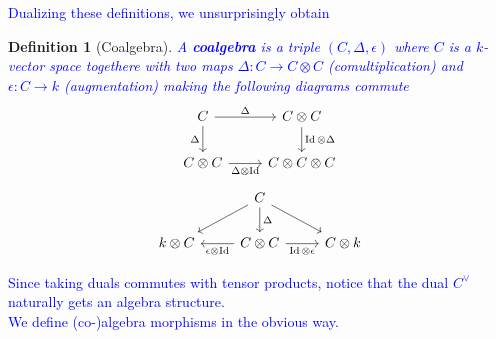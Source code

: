 \documentclass[11pt, a4paper]{article}
\DeclareMathOperator*{\id}{Id}
\newtheorem{defn}{Definition}
\theoremstyle{plain}
\begin{document}
	\textcolor{blue}{
	Dualizing these definitions, we unsurprisingly obtain}
\begin{defn}[Coalgebra]
	\textcolor{blue}{
	A \textbf{coalgebra} is a triple $( C,\Delta,\epsilon) $ where $C$ is a $k$-vector space togethere with two maps $\Delta\colon C \to C \otimes C$ (comultiplication) and $\epsilon\colon C \to k$ (augmentation) making the following diagrams commute}
\[\begin{tikzcd}
	C & {C\otimes C} \\
	{C\otimes C} & {C\otimes C \otimes C}
	\arrow["\Delta", from=1-1, to=1-2]
	\arrow["{\id \otimes \Delta}", from=1-2, to=2-2]
	\arrow["{\Delta \otimes \id}"', from=2-1, to=2-2]
	\arrow["\Delta"', from=1-1, to=2-1]
\end{tikzcd}\]
\[\begin{tikzcd}
	& C \\
	{k\otimes C} & {C\otimes C} & {C\otimes k}
	\arrow["\Delta", from=1-2, to=2-2]
	\arrow[from=1-2, to=2-1]
	\arrow[from=1-2, to=2-3]
	\arrow["{\id \otimes \epsilon}"', from=2-2, to=2-3]
	\arrow["{\epsilon \otimes \id}", from=2-2, to=2-1]
\end{tikzcd}\]
\end{defn}

	\textcolor{blue}{
Since taking duals commutes with tensor products, notice that the dual  $C^{\vee}$ naturally gets an algebra structure.\\
We define (co-)algebra morphisms in the obvious way.}
\end{document}
